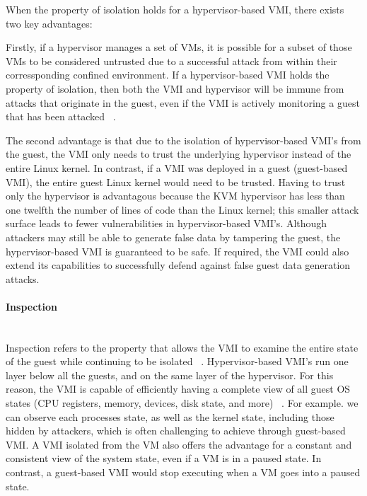 \documentclass{report}
\begin{document}
\begin{spacing}{1.5}
{\large
When the property of isolation holds for a hypervisor-based VMI, there exists two key advantages:
\newline\newline
}

{\large
Firstly, if a hypervisor manages a set of VMs, it is possible for a subset of those VMs to be considered untrusted due to a successful attack from within their corressponding confined environment. If a hypervisor-based VMI holds the property of isolation, then both the VMI and hypervisor will be immune from attacks that originate in the guest, even if the VMI is actively monitoring a guest that has been attacked ~\cite{hebbal2015virtual}.
\newline
}

{\large
The second advantage is that due to the isolation of hypervisor-based VMI's from the guest, the VMI only needs to trust the underlying hypervisor instead of the entire Linux kernel. In contrast, if a VMI was deployed in a guest (guest-based VMI), the entire guest Linux kernel would need to be trusted. Having to trust only the hypervisor is advantagous because the KVM hypervisor has less than one twelfth the number of lines of code than the Linux kernel; this smaller attack surface leads to fewer vulnerabilities in hypervisor-based VMI's. Although attackers may still be able to generate false data by tampering the guest, the hypervisor-based VMI is guaranteed to be safe. If required, the VMI could also extend its capabilities to successfully defend against false guest data generation attacks.
\newline
}


\paragraph{Inspection}\mbox{}\\


{\large
Inspection refers to the property that allows the VMI to examine the entire state of the guest while continuing to be isolated ~\cite{pfoh2009formal}. Hypervisor-based VMI's run one layer below all the guests, and on the same layer of the hypervisor. For this reason, the VMI is capable of efficiently having a complete view of all guest OS states (CPU registers, memory, devices, disk state, and more) ~\cite{hebbal2015virtual}. For example. we can observe each processes state, as well as the kernel state, including those hidden by attackers, which is often challenging to achieve through guest-based VMI. A VMI isolated from the VM also offers the advantage for a constant and consistent view of the system state, even if a VM is in a paused state. In contrast, a guest-based VMI would stop executing when a VM goes into a paused state. 
\newline
}




\end{spacing}
\end{document}
